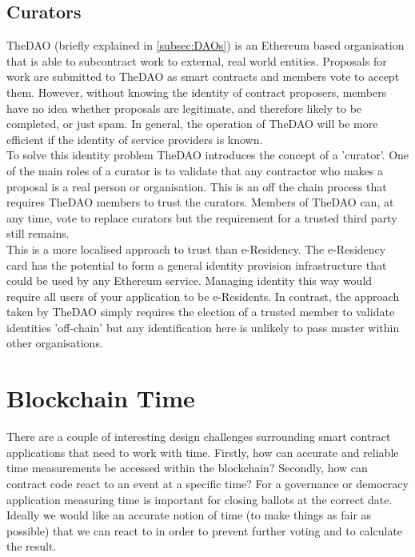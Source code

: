 \subsection{Curators}
TheDAO (briefly explained in \ref{subsec:DAOs}) is an Ethereum based organisation that is able to subcontract work to external, real world entities. Proposals for work are submitted to TheDAO as smart contracts and members vote to accept them. However, without knowing the identity of contract proposers, members have no idea whether proposals are legitimate, and therefore likely to be completed, or just spam. In general, the operation of TheDAO will be more efficient if the identity of service providers is known.\\
 
To solve this identity problem TheDAO introduces the concept of a 'curator'\cite{TaulCurators}. One of the main roles of a curator is to validate that any contractor who makes a proposal is a real person or organisation. This is an off the chain process that requires TheDAO members to trust the curators. Members of TheDAO can, at any time, vote to replace curators but the requirement for a trusted third party still remains.\\

This is a more localised approach to trust than e-Residency. The e-Residency card has the potential to form a general identity provision infrastructure that could be used by any Ethereum service. Managing identity this way would require all users of your application to be e-Residents. In contrast, the approach taken by TheDAO simply requires the election of a trusted member to validate identities 'off-chain' but any identification here is unlikely to pass muster within other organisations. \\



\section{Blockchain Time}
\label{sec:blocktime}
There are a couple of interesting design challenges surrounding smart contract applications that need to work with time. Firstly, how can accurate and reliable time measurements be accessed within the blockchain? Secondly, how can contract code react to an event at a specific time? For a governance or democracy application measuring time is important for closing ballots at the correct date. Ideally we would like an accurate notion of time (to make things as fair as possible) that we can react to in order to prevent further voting and to calculate the result.\\

